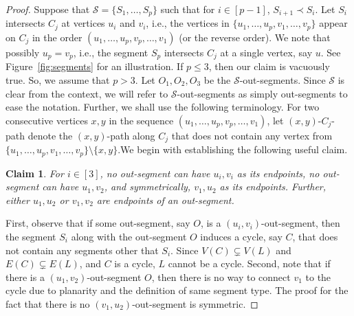 \documentclass{article}
\newtheorem{claim}[theorem]{Claim}
\numberwithin{claimcounter}{lemma}
\newenvironment{proofofclaim}{\renewcommand{\qed}{\hfill $\diamond$}
  \renewcommand{\proofname}{Proof of Claim}\proof}{\endproof}
\begin{document}
\begin{proof}
    Suppose that $\mathcal{S} = \{S_1,\ldots,S_p\}$ such that for $i \in [p-1]$, $S_{i+1} \prec S_i$. Let $S_i$ intersects $C_j$ at vertices $u_i$ and $v_i$, i.e., the vertices in $\{u_1,\ldots, u_p, v_1,\ldots,v_p\}$ appear on $C_j$ in the order $(u_1,\ldots,u_p,v_p,\ldots,v_1)$ (or the reverse order). We note that possibly $u_p=v_p$, i.e., the segment $S_p$ intersects $C_j$ at a single vertex, say $u$.
    See Figure~\ref{fig:segments} for an illustration.   If $p\leq 3$, then  our claim is vacuously true. So, we assume that $p>3$. Let $O_1,O_2,O_3$ be the $\mathcal{S}$-out-segments. Since $\mathcal{S}$ is clear from the context, we will refer to $\mathcal{S}$-out-segments as simply out-segments to ease the notation. Further, we shall use the  following terminology. For two consecutive vertices $x,y$ in the sequence $(u_1,\ldots,u_p,v_p,\ldots,v_1)$, let $(x,y)$-$C_j$-path denote the $(x,y)$-path along $C_j$ that does not contain any vertex from $\{u_1,\ldots,u_p,v_1,\ldots,v_p\}\setminus \{x,y\}$.We begin with establishing  the following useful claim.
    


   \begin{claim}\label{L:T2}
    For $i\in [3]$, no out-segment can have $u_i,v_i$ as its endpoints, no out-segment can have $u_1,v_2$, and symmetrically, $v_1,u_2$ as its endpoints. Further, either $u_1,u_2$  or $v_1,v_2$ are endpoints of an out-segment.
\end{claim}
\begin{proofofclaim}
    First, observe that if some out-segment, say $O$, is a  $(u_i,v_i)$-out-segment, then the segment $S_i$ along with the out-segment $O$ induces a cycle, say $C$, that does not contain any segments other that $S_i$. Since $V(C)\subsetneq V(L)$ and $E(C)\subsetneq E(L)$, and $C$ is a cycle, $L$ cannot be a cycle. Second, note that if there is a $(u_1,v_2)$-out-segment $O$, then there is no way to connect $v_1$ to the cycle due to planarity and the definition of same segment type. The proof for the fact that there is no $(v_1,u_2)$-out-segment is symmetric.
    

\end{proofofclaim}
\end{proof}
\end{document}
